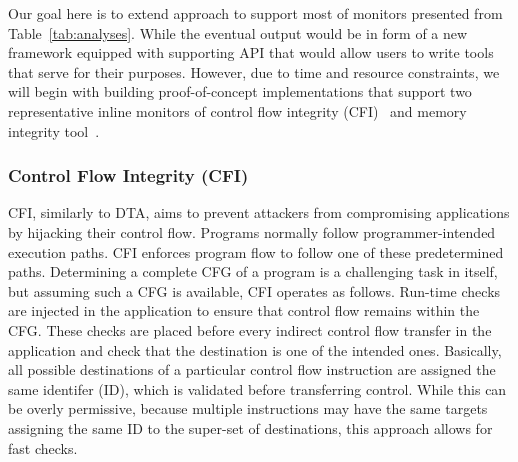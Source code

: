 Our goal here is to extend \sreplica approach to support most of monitors
presented from Table~\ref{tab:analyses}. While the eventual output would be in
form of a new framework equipped with supporting API that would allow users to
write tools that serve for their purposes. However, due to time and resource
constraints, we will begin with building proof-of-concept implementations that
support two representative inline monitors of control flow integrity
(CFI)~\cite{cfi} and memory integrity tool~\cite{memcheck, drmemory:cgo2011}.

\subsubsection{Control Flow Integrity (CFI)} 

CFI, similarly to DTA, aims to prevent attackers from compromising applications
by hijacking their control flow. Programs normally follow programmer-intended
execution paths. CFI enforces program flow to follow one of these predetermined
paths. Determining a complete CFG of a program is a challenging task in itself,
but assuming such a CFG is available, CFI operates as follows.  Run-time checks
are injected in the application to ensure that control flow remains within the
CFG. These checks are placed before every indirect control flow transfer in the
application and check that the destination is one of the intended ones.
Basically, all possible destinations of a particular control flow instruction
are assigned the same identifer (ID), which is validated before transferring
control. While this can be overly permissive, because multiple instructions may
have the same targets assigning the same ID to the super-set of destinations,
this approach allows for fast checks. 

